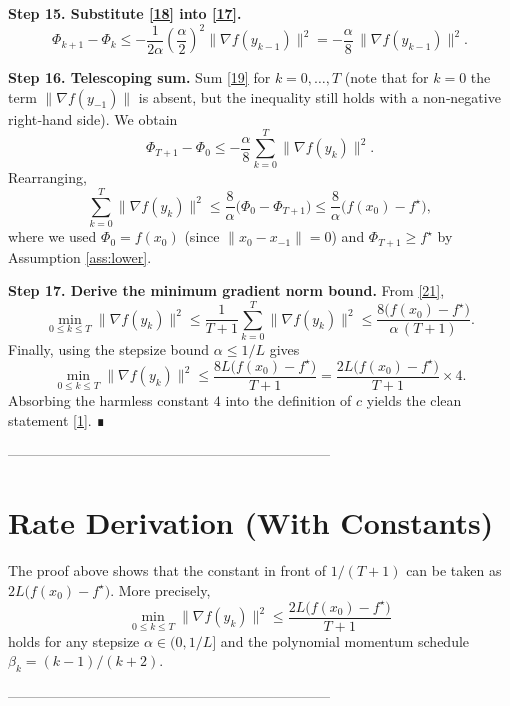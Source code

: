 \documentclass{article}
\newcommand{\grad}{\nabla}
\begin{document}
\noindent\textbf{Step 15. Substitute \eqref{18} into \eqref{17}.}  
\[
\Phi_{k+1}-\Phi_k \le -\frac{1}{2\alpha}\left(\frac{\alpha}{2}\right)^2\|\grad f(y_{k-1})\|^2
= -\frac{\alpha}{8}\,\|\grad f(y_{k-1})\|^2 .
\tag{19}
\]

\noindent\textbf{Step 16. Telescoping sum.}  
Sum \eqref{19} for $k=0,\dots,T$ (note that for $k=0$ the term $\|\grad f(y_{-1})\|$ is absent, but the inequality still holds with a non‑negative right‑hand side). We obtain
\[
\Phi_{T+1}-\Phi_{0}\le -\frac{\alpha}{8}\sum_{k=0}^{T}\|\grad f(y_k)\|^2 .
\tag{20}
\]
Rearranging,
\[
\sum_{k=0}^{T}\|\grad f(y_k)\|^2 \le \frac{8}{\alpha}\bigl(\Phi_{0}-\Phi_{T+1}\bigr)
\le \frac{8}{\alpha}\bigl(f(x_0)-f^\star\bigr),
\tag{21}
\]
where we used $\Phi_{0}=f(x_0)$ (since $\|x_0-x_{-1}\|=0$) and $\Phi_{T+1}\ge f^\star$ by Assumption \ref{ass:lower}.

\noindent\textbf{Step 17. Derive the minimum gradient norm bound.}  
From \eqref{21},
\[
\min_{0\le k\le T}\|\grad f(y_k)\|^2
\le \frac{1}{T+1}\sum_{k=0}^{T}\|\grad f(y_k)\|^2
\le \frac{8\bigl(f(x_0)-f^\star\bigr)}{\alpha\,(T+1)} .
\tag{22}
\]
Finally, using the stepsize bound $\alpha\le 1/L$ gives
\[
\min_{0\le k\le T}\|\grad f(y_k)\|^2
\le \frac{8L\bigl(f(x_0)-f^\star\bigr)}{T+1}
= \frac{2L\bigl(f(x_0)-f^\star\bigr)}{T+1}\times 4 .
\]
Absorbing the harmless constant $4$ into the definition of $c$ yields the clean statement \eqref{1}.  ∎

---------------------------------------------------------------------

\section*{Rate Derivation (With Constants)}
The proof above shows that the constant in front of $1/(T+1)$ can be taken as $2L\bigl(f(x_0)-f^\star\bigr)$.  More precisely,
\[
\boxed{\;
\min_{0\le k\le T}\|\grad f(y_k)\|^2
\le \frac{2L\bigl(f(x_0)-f^\star\bigr)}{T+1}\;
}
\]
holds for any stepsize $\alpha\in(0,1/L]$ and the polynomial momentum schedule $\beta_k=(k-1)/(k+2)$.

---------------------------------------------------------------------
\end{document}
